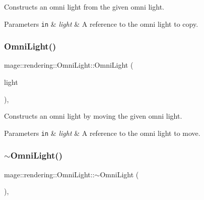 Constructs an omni light from the given omni light.


\begin{DoxyParams}[1]{Parameters}
\mbox{\tt in}  & {\em light} & A reference to the omni light to copy. \\
\hline
\end{DoxyParams}
\hypertarget{classmage_1_1rendering_1_1_omni_light_a235afcf044e62a3f6672316eb8f3cd99}{}\label{classmage_1_1rendering_1_1_omni_light_a235afcf044e62a3f6672316eb8f3cd99} 
\subsubsection{\texorpdfstring{Omni\+Light()}{OmniLight()}\hspace{0.1cm}{\footnotesize\ttfamily [3/3]}}
{\footnotesize\ttfamily mage\+::rendering\+::\+Omni\+Light\+::\+Omni\+Light (\begin{DoxyParamCaption}\item[{\hyperlink{classmage_1_1rendering_1_1_omni_light}{Omni\+Light} \&\&}]{light }\end{DoxyParamCaption})\hspace{0.3cm}{\ttfamily [default]}, {\ttfamily [noexcept]}}

Constructs an omni light by moving the given omni light.


\begin{DoxyParams}[1]{Parameters}
\mbox{\tt in}  & {\em light} & A reference to the omni light to move. \\
\hline
\end{DoxyParams}
\hypertarget{classmage_1_1rendering_1_1_omni_light_af0981e056620d3f0df827098448c8052}{}\label{classmage_1_1rendering_1_1_omni_light_af0981e056620d3f0df827098448c8052} 
\subsubsection{\texorpdfstring{$\sim$\+Omni\+Light()}{~OmniLight()}}
{\footnotesize\ttfamily mage\+::rendering\+::\+Omni\+Light\+::$\sim$\+Omni\+Light (\begin{DoxyParamCaption}{ }\end{DoxyParamCaption})\hspace{0.3cm}{\ttfamily [virtual]}, {\ttfamily [default]}}

